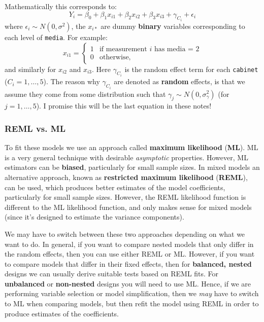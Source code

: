 \documentclass[]{book}
\theoremstyle{definition}
\theoremstyle{definition}
\theoremstyle{definition}
\theoremstyle{remark}
\begin{document}
Mathematically this corresponds to: \[
    Y_i = \beta_0 + \beta_1 x_{i1} + \beta_2 x_{i2}+ \beta_3 x_{i3} + \gamma_{C_i} + \epsilon_i
\] where \(\epsilon_i \sim N(0, \sigma^2)\), the \(x_{i*}\) are dummy
\textbf{binary} variables corresponding to each level of \texttt{media}.
For example: \[
    x_{i1} = \left\{ \begin{array}{ll}
    1 & \mbox{if measurement $i$ has media = 2}\\
    0 & \mbox{otherwise},
    \end{array}
    \right.
\] and similarly for \(x_{i2}\) and \(x_{i3}\). Here \(\gamma_{C_i}\) is
the random effect term for each \texttt{cabinet}
(\(C_i = 1, \dots, 5\)). The reason why \(\gamma_{C_i}\) are denoted as
\textbf{random} effects, is that we assume they come from some
distribution such that \(\gamma_{j} \sim N(0, \sigma^2_{\gamma})\) (for
\(j = 1, \dots, 5\)). I promise this will be the last equation in these
notes!

\subsubsection{\texorpdfstring{\textbf{REML} vs.
\textbf{ML}}{REML vs. ML}}\label{reml-vs.-ml}

To fit these models we use an approach called \textbf{maximum
likelihood} (\textbf{ML}). ML is a very general technique with desirable
\emph{asymptotic} properties. However, ML estimators can be
\textbf{biased}, particularly for small sample sizes. In mixed models an
alternative approach, known as \textbf{restricted maximum likelihood}
(\textbf{REML}), can be used, which produces better estimates of the
model coefficients, particularly for small sample sizes. However, the
REML likelihood function is different to the ML likelihood function, and
only makes sense for mixed models (since it's designed to estimate the
variance components).

We may have to switch between these two approaches depending on what we
want to do. In general, if you want to compare nested models that only
differ in the random effects, then you can use either REML or ML.
However, if you want to compare models that differ in their fixed
effects, then for \textbf{balanced, nested} designs we can usually
derive suitable tests based on REML fits. For \textbf{unbalanced} or
\textbf{non-nested} designs you will need to use ML. Hence, if we are
performing variable selection or model simplification, then we
\emph{may} have to switch to ML when comparing models, but then refit
the model using REML in order to produce estimates of the coefficients.
\end{document}
